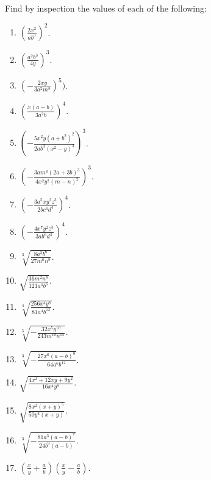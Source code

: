 \documentclass{book}
\begin{document}
Find by inspection the values of each of the following:
\begin{enumerate}

\item $\displaystyle \left(\frac{2x^2}{ab^3}\right)^2$.

\item $\displaystyle \left(\frac{a^2b^3}{4y}\right)^3$.

\item $\displaystyle \left(-\frac{2xy}{3a^2m^3}\right)^5)$.

\item $\displaystyle \left(\frac{x(a-b)}{3a^2b}\right)^4$.

\item $\displaystyle \left(-
\frac{5x^2y(a+b^2)^2}{2ab^3(x^2-y)^3}\right)^3$.

\item $\displaystyle \left(-
\frac{3am^4(2a+3b)^3}{4x^2y^2(m-n)^2}\right)^3$.

\item $\displaystyle \left( -\frac{ 3a^5xy^2z^3 }{ 2bc^4d^4 }
\right)^4$.

\item $\displaystyle \left( -\frac{ 4x^7y^2z^3 }{ 3ab^6d^3 }
\right)^4$.

\item $\displaystyle \sqrt[3]{ \frac{ 8a^3b^6 }{ 27m^6n^9 } }$.

\item $\displaystyle \sqrt{ \frac{ 36m^2n^8 }{ 121a^4b^6 } }$.

\item $\displaystyle \sqrt[4]{ \frac{ 256x^4y^8 }{ 81a^4b^{12} }
}$.

\item $\displaystyle \sqrt[5]{ - \frac{32x^5y^10}{ 243m^10n^15 }
}$.

\item $\displaystyle \sqrt[3]{ -\frac{ 27x^6(a-b)^9 }{ 64a^6b^{12}
} }$.

\item $\displaystyle \sqrt{ \frac{ 4x^2 + 12xy + 9y^2 }{ 16x^4y^8
} }$.

\item $\displaystyle \sqrt{ \frac{ 8x^2(x+y)^5 }{ 50y^4(x+y) } }$.

\item $\displaystyle \sqrt[3]{ -\frac{ 81a^3(a-b)^7 }{ 24b^9(a-b)
} }$.

\item $\displaystyle \left( \frac{x}{y} + \frac{a}{b} \right)
     \left( \frac{x}{y} - \frac{a}{b} \right)$.


\end{enumerate}
\end{document}
